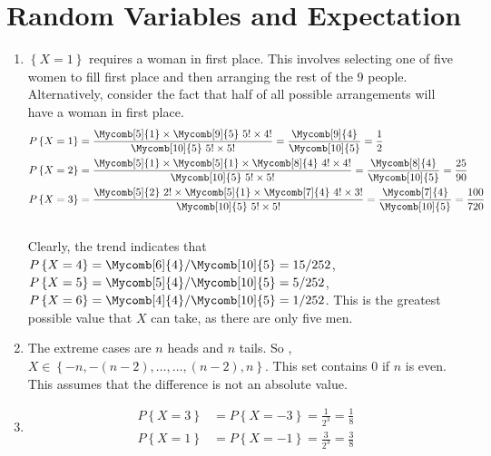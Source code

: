 \chapter{Random Variables and Expectation}

\begin{enumerate}
	\item $ \left\{X = 1 \right\}$ requires a woman in first place. This involves selecting one of five women to fill first place and then arranging the rest of the 9 people. Alternatively, consider the fact that half of all possible arrangements will have a woman in first place.\\
	\begin{align}
		P \left\{X = 1 \right\} &= \frac{\Mycomb[5]{1} \times \Mycomb[9]{5} \ 5! \times 4!}{\Mycomb[10]{5} \ 5! \times 5!} = \frac{\Mycomb[9]{4}}{\Mycomb[10]{5}} = \frac{1}{2} \nonumber \\
		P \left\{X = 2 \right\} &= \frac{\Mycomb[5]{1} \times \Mycomb[5]{1} \times \Mycomb[8]{4}\ 4! \times 4!}{\Mycomb[10]{5} \ 5! \times 5!} = \frac{\Mycomb[8]{4}}{\Mycomb[10]{5}} = \frac{25}{90} \nonumber \\
		P \left\{X = 3 \right\} &= \frac{\Mycomb[5]{2}\ 2! \times \Mycomb[5]{1} \times \Mycomb[7]{4}\ 4! \times 3!}{\Mycomb[10]{5} \ 5! \times 5!} = \frac{\Mycomb[7]{4}}{\Mycomb[10]{5}} = \frac{100}{720}
	\end{align}\\
	
	Clearly, the trend indicates that \\
	$ P \left\{X = 4 \right\}  = \Mycomb[6]{4} / \Mycomb[10]{5} = 15/252$, \\
	$ P \left\{X = 5 \right\}  = \Mycomb[5]{4} / \Mycomb[10]{5} = 5/252$, \\
	$ P \left\{X = 6 \right\}  = \Mycomb[4]{4} / \Mycomb[10]{5} = 1/252$. This is the greatest possible value that $ X $ can take, as there are only five men. \\
	
	\item The extreme cases are $ n $ heads and $ n $ tails. So , \\
	$ X \in \left\{-n, -(n-2), \dots, \dots, (n-2), n \right\} $. This set contains $ 0 $ if $ n $ is even. This assumes that the difference is not an absolute value. \\
	
	\item \begin{align}
		P \left\{X = 3 \right\} &= P \left\{X = -3 \right\} = \frac{1}{2^3} = \frac{1}{8} \nonumber \\
		P \left\{X = 1 \right\} &= P \left\{X = -1 \right\} = \frac{3}{2^3} = \frac{3}{8}
	\end{align}\\
	

\end{enumerate}
